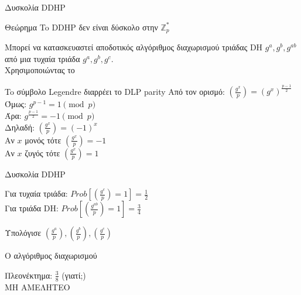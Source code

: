 \documentclass[handout]{beamer}
\begin{document}
\begin{frame}{Δυσκολία DDHP}

\begin{block}{Θεώρημα}
To DDHP δεν είναι δύσκολο στην $\mathbb{Z}_p^*$
\end{block}
 
Μπορεί να κατασκευαστεί αποδοτικός αλγόριθμος διαχωρισμού τριάδας DH $g^a,g^b,g^{ab}$ από μια τυχαία τριάδα $g^a,g^b,g^c$.\\
\pause
{} Χρησιμοποιώντας το 
 
\begin{block}{To σύμβολο Legendre διαρρέει το DLP parity}
Από τον ορισμό: 
$(\frac{g^{x}}{p}) = (g^{x})^{\frac{p-1}{2}}$ \\ \pause
Όμως: $g^{p-1} = 1 \pmod{p}$  \pause \\ 
Άρα: 
$g^\frac{p-1}{2} = -1 \pmod{p}$ \pause\\
Δηλαδή:
$(\frac{g^{x}}{p}) = (-1)^x$ \pause\\
Αν $x$ μονός  τότε $(\frac{g^{x}}{p}) = -1$  \\ \pause
Αν $x$ ζυγός  τότε $(\frac{g^{x}}{p}) = 1$   
\end{block}
\end{frame}

\begin{frame}{Δυσκολία DDHP}
\begin{small}
Για τυχαία τριάδα: $Prob[(\frac{g^{c}}{p}) = 1] = \frac{1}{2}$ \\
\pause
Για τριάδα DH: $Prob[(\frac{g^{ab}}{p}) = 1] = \frac{3}{4}$
\pause 

	\begin{algorithm}[H]
	Υπολόγισε $(\frac{g^{a}}{p}),(\frac{g^{b}}{p}),(\frac{g^{c}}{p})$\;

	\caption{Ο αλγόριθμος διαχωρισμού}
  \end{algorithm}

\pause
Πλεονέκτημα: $\frac{3}{8}$ (γιατί;) \\

\alert{ΜΗ ΑΜΕΛΗΤΕΟ}\\
\end{small}
\end{frame}
\end{document}
